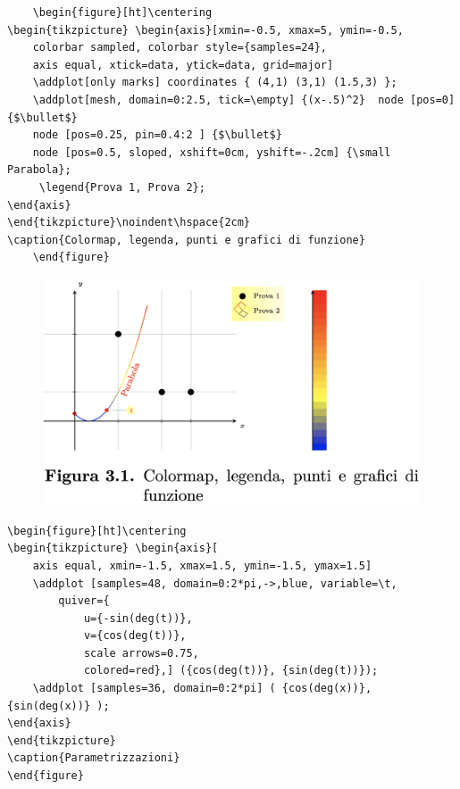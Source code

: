 \begin{verbatim}
	\begin{figure}[ht]\centering
\begin{tikzpicture} \begin{axis}[xmin=-0.5, xmax=5, ymin=-0.5,
	colorbar sampled, colorbar style={samples=24}, 
	axis equal, xtick=data, ytick=data, grid=major]
    \addplot[only marks] coordinates { (4,1) (3,1) (1.5,3) };
   	\addplot[mesh, domain=0:2.5, tick=\empty] {(x-.5)^2}  node [pos=0]  {$\bullet$}      
   	node [pos=0.25, pin=0.4:2 ] {$\bullet$}
   	node [pos=0.5, sloped, xshift=0cm, yshift=-.2cm] {\small Parabola}; 
     \legend{Prova 1, Prova 2};     
\end{axis}	
\end{tikzpicture}\noindent\hspace{2cm}
\caption{Colormap, legenda, punti e grafici di funzione}
    \end{figure}
\end{verbatim}

\begin{figure}[ht]\centering
\includegraphics[scale=.4]{FileAusiliari/Screenshots/Figura3-1.png}
\end{figure}

\newpage

\begin{verbatim}
\begin{figure}[ht]\centering
\begin{tikzpicture} \begin{axis}[
    axis equal, xmin=-1.5, xmax=1.5, ymin=-1.5, ymax=1.5]
    \addplot [samples=48, domain=0:2*pi,->,blue, variable=\t,
        quiver={
            u={-sin(deg(t))},
            v={cos(deg(t))},
            scale arrows=0.75,
            colored=red},] ({cos(deg(t))}, {sin(deg(t))});
    \addplot [samples=36, domain=0:2*pi] ( {cos(deg(x))}, {sin(deg(x))} );
\end{axis}
\end{tikzpicture}
\caption{Parametrizzazioni}
\end{figure}
\end{verbatim}


